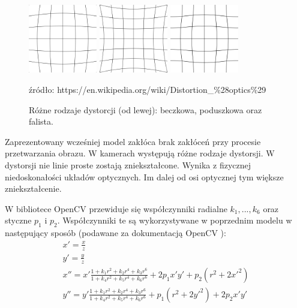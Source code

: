 \documentclass[oneside, eng]{mgr}
\begin{document}
\begin{figure}
\centering
		\begin{minipage}{3cm}
			\includegraphics[width=3cm]{600px-Barrel_distortion.png}
		\end{minipage}
		\begin{minipage}{3cm}
			\includegraphics[width=3cm]{600px-Pincushion_distortion.png}
		\end{minipage}
		\begin{minipage}{3cm}
			\includegraphics[width=3cm]{600px-Mustache_distortion.png}
		\end{minipage}
	\caption{Różne rodzaje dystorcji (od lewej): beczkowa, poduszkowa oraz falista.}
źródło: https://en.wikipedia.org/wiki/Distortion\_\%28optics\%29
	\label{fig:distortion}
\end{figure}

Zaprezentowany wcześniej model zakłóca brak zakłóceń przy procesie przetwarzania obrazu. W kamerach występują różne rodzaje dystorsji. W dystorsji nie linie proste zostają zniekształcone. Wynika z fizycznej niedoskonałości układów optycznych. Im dalej od osi optycznej tym większe zniekształcenie.

W bibliotece OpenCV przewiduje się współczynniki radialne $k_1, ..., k_6$ oraz styczne $p_1$ i $p_2$. Współczynniki te są wykorzystywane w poprzednim modelu w następujący sposób (podawane za dokumentacją OpenCV \cite{Dokumentacja OpenCV}):
\begin{gather*}
	x' = \frac{x}{z} \\
	y' = \frac{y}{z} \\
	x'' = x' \frac{1+k_1 r^2 + k_2 r^4 + k_3 r^6}{1+k_4 r^2+k_5 r^4+k_6 r^6} +
	2 p_1 x' y' + p_2(r^2 + 2 x'^2)	\\
	y'' = y' \frac{1+k_1 r^2 + k_2 r^4 + k_3 r^6}{1+k_4 r^2+k_5 r^4+k_6 r^6} +
	p_1(r^2 + 2 y'^2) + 2 p_2 x' y'
\end{gather*}
\end{document}
